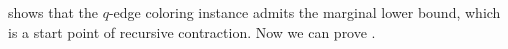  shows that the $q$-edge coloring instance admits the marginal lower bound, which is a start point of recursive contraction.
Now we can prove .
